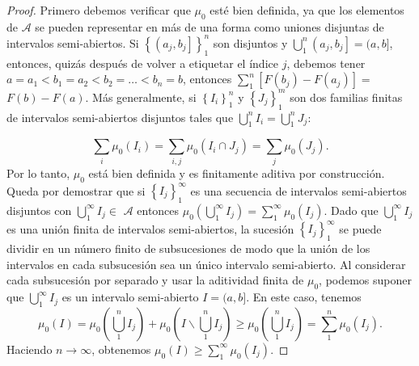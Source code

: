 \begin{proof}
 Primero debemos verificar que $\mu_{0}$ esté bien definida, ya que los elementos de $\mathcal{A}$ se pueden representar en más de una forma como uniones disjuntas de intervalos semi-abiertos. Si $\left\{\left(a_{j}, b_{j}\right]\right\}_{1}^{n}$ son disjuntos y $\bigcup_{1}^{n}\left( a_{j}, b_{j}\right]=(a, b]$, entonces, quizás después de volver a etiquetar el índice $j$, debemos tener $a=a_{1}<b_{1}=a_{2 }<b_{2}=\ldots<b_{n}=b$, entonces $\sum_{1}^{n}\left[F\left(b_{j}\right)-F\left(a_{ j}\right)\right]=$ $F(b)-F(a)$. Más generalmente, si $\left\{I_{i}\right\}_{1}^{n}$ y $ \left\{J_{j}\right\}_{1}^{m}$ son dos familias  finitas de intervalos semi-abiertos disjuntos tales que $\bigcup_{1}^{n} I_{i}=\bigcup_{1}^{n} J_{j}$:
 
$$
\sum_{i} \mu_{0}\left(I_{i}\right)=\sum_{i, j} \mu_{0}\left(I_{i} \cap J_{j}\right)= \sum_{j} \mu_{0}\left(J_{j}\right) .
$$
Por lo tanto, $\mu_{0}$ está bien definida y es finitamente aditiva por construcción.
Queda por demostrar que si $\left\{I_{j}\right\}_{1}^{\infty}$ es una secuencia de intervalos semi-abiertos disjuntos con $\bigcup_{1}^{\infty} I_ {j} \in$ $\mathcal{A}$ entonces $\mu_{0}\left(\bigcup_{1}^{\infty} I_{j}\right)=\sum_{1}^{\infty } \mu_{0}\left(I_{j}\right)$. Dado que $\bigcup_{1}^{\infty} I_{j}$ es una unión finita de  intervalos semi-abiertos, la sucesión $\left\{I_{j}\right\}_{1}^{\infty} $ se puede dividir en un número finito de subsucesiones de modo que la unión de los intervalos en cada subsucesión sea un único intervalo semi-abierto. Al considerar cada subsucesión por separado y usar la aditividad finita de $\mu_{0}$, podemos suponer que $\bigcup_{1}^{\infty} I_{j}$ es un intervalo semi-abierto $I=(a, b]$. En este caso, tenemos
$$
\mu_{0}(I)=\mu_{0}\left(\bigcup_{1}^{n} I_{j}\right)+\mu_{0}\left(I \backslash \bigcup_{1} ^{n} I_{j}\right) \geq \mu_{0}\left(\bigcup_{1}^{n} I_{j}\right)=\sum_{1}^{n} \mu_{ 0}\left(I_{j}\right) .
$$
Haciendo $n \rightarrow \infty$, obtenemos $\mu_{0}(I) \geq \sum_{1}^{\infty} \mu_0\left(I_{j}\right)$. 


\end{proof}
